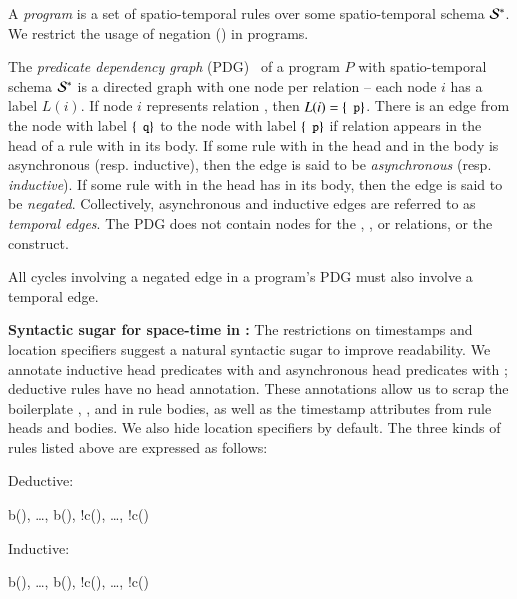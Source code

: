 A \lang \emph{program} is a set of spatio-temporal rules over some spatio-temporal schema $\stschema$.  We restrict the usage of negation (\dedalus{!}) in \lang programs.

The {\em predicate dependency graph} (PDG)~\cite{ullmanbook} of a \lang program $P$ with spatio-temporal schema $\stschema$ is a directed graph with one node per relation -- each node $i$ has a label $L(i)$.  If node $i$ represents relation , then $L(i) = \{\dedalus{p}\}$.  There is an edge from the node with label $\{\dedalus{q}\}$ to the node with label $\{\dedalus{p}\}$ if relation  appears in the head of a rule with  in its body.  If some rule with  in the head and  in the body is asynchronous (resp. inductive), then the edge is said to be {\em asynchronous} (resp. {\em inductive}).  If some rule with  in the head has  in its body, then the edge is said to be {\em negated}.  Collectively, asynchronous and inductive edges are referred to as {\em temporal edges}.  The PDG does not contain nodes for the , , or \dedalus{<} relations, or the  construct.

All cycles involving a negated edge in a \lang program's PDG must also involve a temporal edge.

\noindent
\textbf{Syntactic sugar for space-time in \lang:}
The restrictions on timestamps and location specifiers suggest a natural syntactic sugar to improve readability.  We annotate inductive head predicates with  and asynchronous head predicates with ; deductive rules have no head annotation.  These annotations allow us to scrap the boilerplate , ,  and  in rule bodies, as well as the timestamp attributes from rule heads and bodies.  We also hide location specifiers by default. The three kinds of rules listed above are expressed as follows:

Deductive:

\begin{Drules}
        {b(), \ldots, b(), !c(), \ldots, !c()}
\end{Drules}

Inductive:

\begin{Drules}
        {b(), \ldots, b(), !c(), \ldots, !c()}
\end{Drules}

